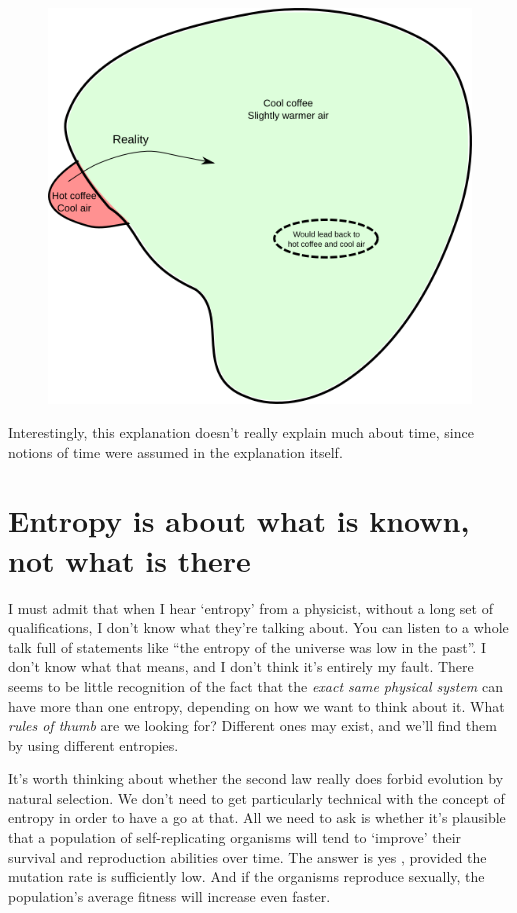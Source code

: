 \documentclass[a4paper, 12pt]{article}
\begin{document}
\begin{figure}
\centering
\includegraphics[scale=0.6]{diagrams.png}
\end{figure}

Interestingly, this explanation doesn't really explain much about time,
since notions of time were assumed in the explanation itself.



\section*{Entropy is about what is known, not what is there}


I must admit that when I hear `entropy' from a physicist, without a long
set of qualifications, I don't know what they're talking about. You can listen
to a whole talk full of statements like ``the entropy of the universe was
low in the past''. I don't know what that means,
and I don't think it's entirely my fault.
There seems to be little recognition of the fact
that the {\em exact same physical system}
can have more than one entropy, depending on how we want to think about it.
What {\em rules of thumb} are we looking for? Different ones may exist, and
we'll find them by using different entropies.

It's worth thinking about whether the second law really does forbid evolution
by natural selection. We don't need to get particularly technical with the
concept of entropy in order to have a go at that. All we need to ask is whether
it's plausible that a population of self-replicating organisms will tend to
`improve' their survival and reproduction abilities over time.
The answer is yes \citep{mackay}, provided the mutation rate is sufficiently
low. And if the organisms reproduce sexually, the population's average fitness
will increase even faster.
\end{document}
